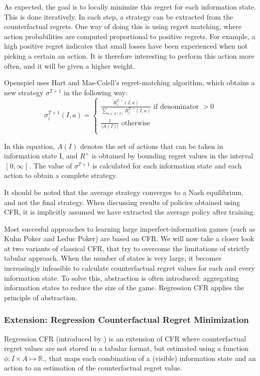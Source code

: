 \documentclass[10pt,a4paper]{article}
\begin{document}
As expected, the goal is to locally minimize this regret for each information state. This is done iteratively. In each step, a strategy can be extracted from the counterfactual regrets. One way of doing this is using regret matching, where action probabilities are computed proportional to positive regrets. For example, a high positive regret indicates that small losses have been experienced when not picking a certain an action. It is therefore interesting to perform this action more often, and it will be given a higher weight.

Openspiel uses Hart and Mas-Colell's regret-matching algorithm, which obtains a new strategy $\sigma^{T+1}$ in the following way:
\begin{equation}
\sigma_{i}^{T+1}(I,a) = 
	\begin{cases}
	\frac{R_{i}^{T,+}(I,a)}{\sum_{a \in A(I)}{R_{i}^{T,+}(I,a)}} \text{ if denominator }> 0 \\
	\frac{1}{|A(I)|} \text{ otherwise}\\
	\end{cases}
\end{equation}

In this equation, $A(I)$ denotes the set of actions that can be taken in information state I, and $R^+$ is obtained by bounding regret values in the interval $\mathclose[0,\infty\mathclose[$. The value of $\sigma^{T+1}$ is calculated for each information state and each action to obtain a complete strategy.

It should be noted that the average strategy converges to a Nash equilibrium, and not the final strategy. When discussing results of policies obtained using CFR, it is implicitly assumed we have extracted the average policy after training.

Most succesful approaches to learning large imperfect-information games (such as Kuhn Poker and Leduc Poker) are based on CFR. We will now take a closer look at two variants of classical CFR, that try to overcome the limitations of strictly tabular approach. When the number of states is very large, it becomes increasingly infeasible to calculate counterfactual regret values for each and every information state. To solve this, abstraction is often introduced: aggregating information states to reduce the size of the game. Regression CFR applies the principle of abstraction.

\subsubsection{Extension: Regression Counterfactual Regret Minimization}
\label{sub:rcfr}
Regression CFR (introduced by \citeauthor{regression_cfr} \citep{regression_cfr}) is an extension of CFR where counterfactual regret values are not stored in a tabular format, but estimated using a function $\phi: I \times A \mapsto \mathbb{R}$., that maps each combination of a (visible) information state and an action to an estimation of the counterfactual regret value.\\
\end{document}
